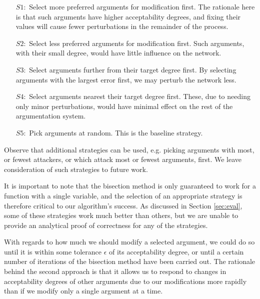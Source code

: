 \documentclass{article}
\begin{document}
\begin{itemize}
    \item[$S1:$] Select more preferred arguments for modification first. The rationale here is that such arguments have higher acceptability degrees, and fixing their values will cause fewer perturbations in the remainder of the process.
    \item[$S2:$] Select less preferred arguments for modification first. Such arguments, with their small degree, would have little influence on the network.
    \item[$S3:$] Select arguments further from their target degree first. By selecting arguments with the largest error first, we may perturb the network less.
    \item[$S4:$] Select arguments nearest their target degree first. These, due to needing only minor perturbations, would have minimal effect on the rest of the argumentation system.
    \item[$S5:$] Pick arguments at random. This is the baseline strategy.
\end{itemize}

Observe that additional strategies can be used, e.g. picking arguments with most, or fewest attackers, or which attack most or fewest arguments, first. We leave consideration of such strategies to future work.

It is important to note that the bisection method is only guaranteed to work for a function with a single variable, and the selection of an appropriate strategy is therefore critical to our algorithm's success. As discussed in Section \ref{sec:eval}, some of these strategies work much better than others, but we are unable to provide an analytical proof of correctness for any of the strategies.

With regards to how much we should modify a selected argument, we could do so until it is within some tolerance $\epsilon$ of its acceptability degree, or until a certain number of iterations of the bisection method have been carried out. The rationale behind the second approach is that it allows us to respond to changes in acceptability degrees of other arguments due to our modifications more rapidly than if we modify only a single argument at a time.
\end{document}
